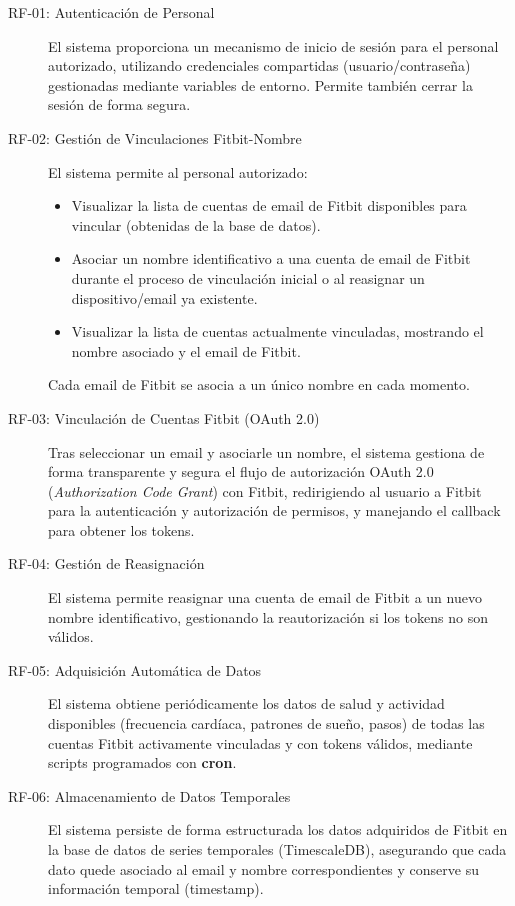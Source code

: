 \begin{description}
    \item[RF-01: Autenticación de Personal] El sistema proporciona un mecanismo de inicio de sesión para el personal autorizado, utilizando credenciales compartidas (usuario/contraseña) gestionadas mediante variables de entorno. Permite también cerrar la sesión de forma segura.
    \item[RF-02: Gestión de Vinculaciones Fitbit\textsuperscript{\textregistered}-Nombre] El sistema permite al personal autorizado:
        \begin{itemize}
            \item Visualizar la lista de cuentas de email de Fitbit\textsuperscript{\textregistered} disponibles para vincular (obtenidas de la base de datos).
            \item Asociar un nombre identificativo a una cuenta de email de Fitbit\textsuperscript{\textregistered} durante el proceso de vinculación inicial o al reasignar un dispositivo/email ya existente.
            \item Visualizar la lista de cuentas actualmente vinculadas, mostrando el nombre asociado y el email de Fitbit\textsuperscript{\textregistered}. 
        \end{itemize}
        Cada email de Fitbit se asocia a un único nombre en cada momento.
    \item[RF-03: Vinculación de Cuentas Fitbit\textsuperscript{\textregistered} (OAuth 2.0)] Tras seleccionar un email y asociarle un nombre, el sistema gestiona de forma transparente y segura el flujo de autorización OAuth 2.0 (\textit{Authorization Code Grant}) con Fitbit\textsuperscript{\textregistered}, redirigiendo al usuario a Fitbit para la autenticación y autorización de permisos, y manejando el callback para obtener los tokens.
    \item[RF-04: Gestión de Reasignación] El sistema permite reasignar una cuenta de email de Fitbit\textsuperscript{\textregistered} a un nuevo nombre identificativo, gestionando la reautorización si los tokens no son válidos.
    \item[RF-05: Adquisición Automática de Datos] El sistema obtiene periódicamente los datos de salud y actividad disponibles (frecuencia cardíaca, patrones de sueño, pasos) de todas las cuentas Fitbit\textsuperscript{\textregistered} activamente vinculadas y con tokens válidos, mediante scripts programados con \textbf{cron}.
    \item[RF-06: Almacenamiento de Datos Temporales] El sistema persiste de forma estructurada los datos adquiridos de Fitbit\textsuperscript{\textregistered} en la base de datos de series temporales (TimescaleDB), asegurando que cada dato quede asociado al email y nombre correspondientes y conserve su información temporal (timestamp).

\end{description}

